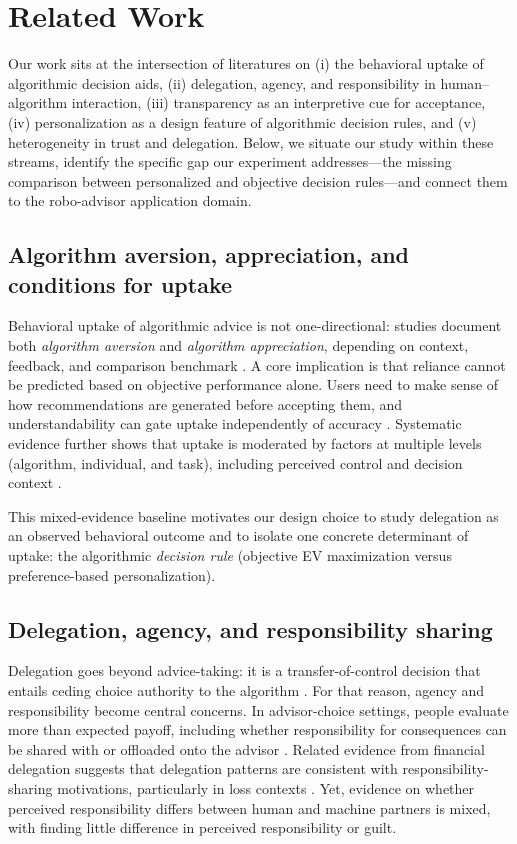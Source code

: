 \documentclass[a4paper, 12pt, fleqn]{article}
\theoremstyle{definition}
\begin{document}
\section{Related Work}
\label{sec:related}

Our work sits at the intersection of literatures on (i) the behavioral uptake of algorithmic decision aids, (ii) delegation, agency, and responsibility in human--algorithm interaction, (iii) transparency as an interpretive cue for acceptance, (iv) personalization as a design feature of algorithmic decision rules, and (v) heterogeneity in trust and delegation. Below, we situate our study within these streams, identify the specific gap our experiment addresses---the missing comparison between personalized and objective decision rules---and connect them to the robo-advisor application domain.

\subsection{Algorithm aversion, appreciation, and conditions for uptake}
Behavioral uptake of algorithmic advice is not one-directional: studies document both \emph{algorithm aversion} and \emph{algorithm appreciation}, depending on context, feedback, and comparison benchmark \citep{Dietvorst2018,Logg2019}. A core implication is that reliance cannot be predicted based on objective performance alone. Users need to make sense of how recommendations are generated before accepting them, and understandability can gate uptake independently of accuracy \citep{Yeomans2019}. Systematic evidence further shows that uptake is moderated by factors at multiple levels (algorithm, individual, and task), including perceived control and decision context \citep{Mahmud2022,Chugunova2022}.

This mixed-evidence baseline motivates our design choice to study delegation as an observed behavioral outcome and to isolate one concrete determinant of uptake: the algorithmic \emph{decision rule} (objective EV maximization versus preference-based personalization).

\subsection{Delegation, agency, and responsibility sharing}
Delegation goes beyond advice-taking: it is a transfer-of-control decision that entails ceding choice authority to the algorithm \citep{Candrian2022}. For that reason, agency and responsibility become central concerns. In advisor-choice settings, people evaluate more than expected payoff, including whether responsibility for consequences can be shared with or offloaded onto the advisor \citep{Gazit2023}. Related evidence from financial delegation suggests that delegation patterns are consistent with responsibility-sharing motivations, particularly in loss contexts \citep{Werner2026}. Yet, evidence on whether perceived responsibility differs between human and machine partners is mixed, with \citet{Kirchkamp2019} finding little difference in perceived responsibility or guilt.
\end{document}
